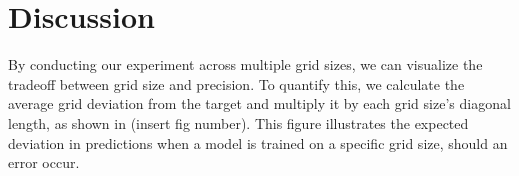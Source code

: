 \documentclass[conference]{IEEEtran}
\begin{document}

	
	
	\section{Discussion}
	By conducting our experiment across multiple grid sizes, we can visualize the tradeoff between grid size and precision. To quantify this, we calculate the average grid deviation from the target and multiply it by each grid size’s diagonal length, as shown in (insert fig number). This figure illustrates the expected deviation in predictions when a model is trained on a specific grid size, should an error occur.
	
\end{document}
